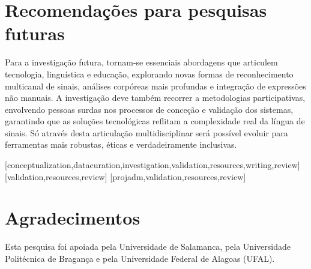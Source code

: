 \documentclass[portuguese]{textolivre}
\begin{document}
\section{Recomendações para pesquisas futuras}
Para a investigação futura, tornam-se essenciais abordagens que articulem tecnologia, linguística e educação, explorando novas formas de reconhecimento multicanal de sinais, análises corpóreas mais profundas e integração de expressões não manuais. A investigação deve também recorrer a metodologias participativas, envolvendo pessoas surdas nos processos de conceção e validação dos sistemas, garantindo que as soluções tecnológicas reflitam a complexidade real da língua de sinais. Só através desta articulação multidisciplinar será possível evoluir para ferramentas mais robustas, éticas e verdadeiramente inclusivas.

\printbibliography\label{sec-bib}


\begin{contributors}
[conceptualization,datacuration,investigation,validation,resources,writing,review]
[validation,resources,review]
[projadm,validation,resources,review]
\end{contributors}

\begin{dataavailability}
\end{dataavailability}

\section*{\fontsize{10}{12}\selectfont Agradecimentos}
Esta pesquisa foi apoiada pela Universidade de Salamanca, pela Universidade Politécnica de Bragança e pela Universidade Federal de Alagoas (UFAL).
\end{document}
